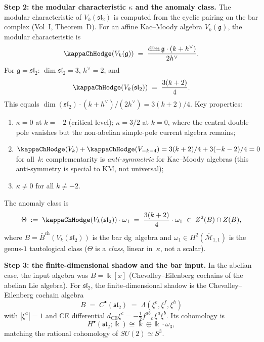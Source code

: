 \begin{construction}
\medskip
\noindent\textbf{Step 2: the modular characteristic $\kappa$ and
the anomaly class.}
The modular characteristic of $V_k(\mathfrak{sl}_2)$ is computed from
the cyclic pairing on the bar complex (Vol~I, Theorem~D). For an
affine Kac--Moody algebra $V_k(\mathfrak{g})$, the modular
characteristic is
\begin{equation}\label{eq:km-kappa}
\kappaChHodge(V_k(\mathfrak{g}))
\;=\;
\frac{\dim\mathfrak{g}\cdot(k+h^\vee)}{2h^\vee}.
\end{equation}
For $\mathfrak{g}=\mathfrak{sl}_2$: $\dim\mathfrak{sl}_2=3$,
$h^\vee=2$, and
\begin{equation}\label{eq:su2-kappa}
\kappaChHodge(V_k(\mathfrak{sl}_2))
\;=\;
\frac{3(k+2)}{4}.
\end{equation}
This equals $\dim(\mathfrak{sl}_2)\cdot(k+h^\vee)/(2h^\vee)
= 3(k+2)/4$. Key properties:
\begin{enumerate}[label=\textup{(\roman*)}]
\item $\kappa = 0$ at $k=-2$ (critical level); $\kappa = 3/2$ at
 $k=0$, where the central double pole vanishes but the
 non-abelian simple-pole current algebra remains;
\item $\kappaChHodge(V_k) + \kappaChHodge(V_{-k-4}) = 3(k+2)/4 + 3(-k-2)/4 = 0$
 for all~$k$: complementarity is \emph{anti-symmetric} for
 Kac--Moody algebras (this anti-symmetry is special
 to KM, not universal);
\item $\kappa\neq 0$ for all $k\neq -2$.
\end{enumerate}

The anomaly class is
\begin{equation}\label{eq:su2-anomaly-class}
\Theta
\;:=\;
\kappaChHodge(V_k(\mathfrak{sl}_2))\cdot\omega_1
\;=\;
\frac{3(k+2)}{4}\cdot\omega_1
\;\in\;
Z^2(B)\cap Z(B),
\end{equation}
where $B = \bar B^{\mathrm{ch}}(V_k(\mathfrak{sl}_2))$ is the bar
dg~algebra and $\omega_1\in H^2(\overline{\mathcal{M}}_{1,1})$ is
the genus-$1$ tautological class ($\Theta$ is a \emph{class},
linear in~$\kappa$, not a scalar).

\medskip
\noindent\textbf{Step 3: the finite-dimensional shadow and the bar input.}
In the abelian case, the input algebra was $B=\Bbbk[x]$
(Chevalley--Eilenberg cochains of the abelian Lie algebra). For
\(\mathfrak{sl}_2\), the finite-dimensional shadow is the
Chevalley--Eilenberg cochain algebra
\begin{equation}\label{eq:su2-ce-input}
B
\;=\;
C^\bullet(\mathfrak{sl}_2)
\;=\;
\Lambda(\xi^e,\xi^f,\xi^h)
\end{equation}
with $|\xi^a|=1$ and CE differential
$d_{\mathrm{CE}}\xi^c = -\tfrac{1}{2}f^{ab}{}_c\,\xi^a\xi^b$.
Its cohomology is
\[
H^\bullet(\mathfrak{sl}_2;\Bbbk)
\cong \Bbbk\oplus \Bbbk\cdot\omega_3,
\]
matching the rational cohomology of \(SU(2)\simeq S^3\).


\end{construction}
